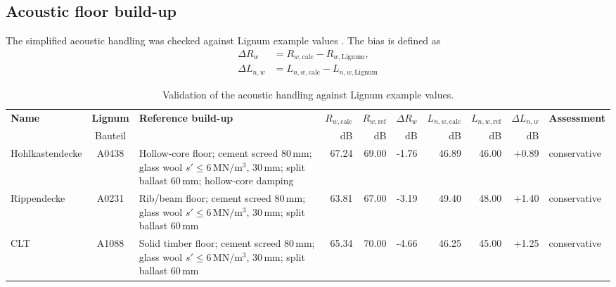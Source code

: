 \newpage
\subsection{Acoustic floor build-up}

The simplified acoustic handling was checked against Lignum example values
\cite{LignumData_Decken}. The bias is defined as
\begin{equation}
    \begin{aligned}
        \Delta R_w &= R_{w,\mathrm{calc}} - R_{w,\mathrm{Lignum}},\\
        \Delta L_{n,w} &= L_{n,w,\mathrm{calc}} - L_{n,w,\mathrm{Lignum}}
    \end{aligned}
\end{equation}


\begin{table}[h]
    \centering
    \begingroup
    \scriptsize
    \caption{Validation of the acoustic handling against Lignum example values. \label{tab:acoustic_validation_lignum}}
    \setlength{\tabcolsep}{3.5pt}
    \renewcommand{\arraystretch}{1.2}
    \begin{tabularx}{\textwidth}{@{}l|c|>{\raggedright\arraybackslash}X|r|r|r|r|r|r|l@{}}
    \hline
    \textbf{Name} &
    \textbf{Lignum} &
    \textbf{Reference build-up} &
    \textbf{$R_{w,\mathrm{calc}}$} &
    \textbf{$R_{w,\mathrm{ref}}$} &
    \textbf{$\Delta R_w$} &
    \textbf{$L_{n,w,\mathrm{calc}}$} &
    \textbf{$L_{n,w,\mathrm{ref}}$} &
    \textbf{$\Delta L_{n,w}$} &
    \textbf{Assessment} \\
    & Bauteil & & dB & dB & dB & dB & dB & dB & \\ \hline

    Hohlkastendecke &
    A0438 &
    Hollow-core floor; cement screed $80\,\mathrm{mm}$; glass wool $s'\leq6\,\mathrm{MN/m^3}$, $30\,\mathrm{mm}$; split ballast $60\,\mathrm{mm}$; hollow-core damping &
    67.24 & 69.00 & -1.76 & 46.89 & 46.00 & +0.89 & conservative \\

    Rippendecke &
    A0231 &
    Rib/beam floor; cement screed $80\,\mathrm{mm}$; glass wool $s'\leq6\,\mathrm{MN/m^3}$, $30\,\mathrm{mm}$; split ballast $60\,\mathrm{mm}$ &
    63.81 & 67.00 & -3.19 & 49.40 & 48.00 & +1.40 & conservative \\

    CLT &
    A1088 &
    Solid timber floor; cement screed $80\,\mathrm{mm}$; glass wool $s'\leq6\,\mathrm{MN/m^3}$, $30\,\mathrm{mm}$; split ballast $60\,\mathrm{mm}$ &
    65.34 & 70.00 & -4.66 & 46.25 & 45.00 & +1.25 & conservative \\


\end{tabularx}
\end{table}
